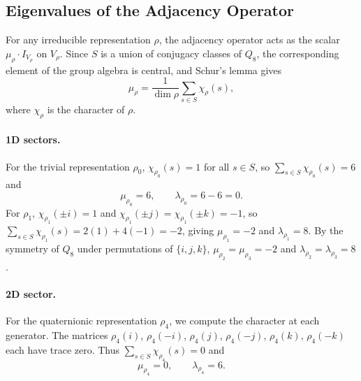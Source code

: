 \subsection{Eigenvalues of the Adjacency Operator}
  \label{subsec:eigenvalues-of-adjacency-operator}

  For any irreducible representation $\rho$, the adjacency operator acts as the
  scalar $\mu_\rho \cdot I_{V_\rho}$ on $V_\rho$.
  Since $S$ is a union of conjugacy classes of $Q_8$, the corresponding element
  of the group algebra is central, and Schur's lemma gives
  \begin{equation}
    \mu_\rho = \frac{1}{\dim \rho} \sum_{s \in S} \chi_\rho(s),
  \end{equation}
  where $\chi_\rho$ is the character of $\rho$.

  \paragraph{1D sectors.}
    For the trivial representation $\rho_0$, $\chi_{\rho_0}(s) = 1$ for all
    $s \in S$, so $\sum_{s \in S} \chi_{\rho_0}(s) = 6$ and
    \begin{equation}
      \mu_{\rho_0} = 6,
      \qquad
      \lambda_{\rho_0} = 6 - 6 = 0.
    \end{equation}
    For $\rho_1$, $\chi_{\rho_1}(\pm i) = 1$ and
    $\chi_{\rho_1}(\pm j) = \chi_{\rho_1}(\pm k) = -1$,
    so $\sum_{s \in S} \chi_{\rho_1}(s) = 2(1) + 4(-1) = -2$, giving
    $\mu_{\rho_1} = -2$ and $\lambda_{\rho_1} = 8$.
    By the symmetry of $Q_8$ under permutations of $\{i,j,k\}$,
    $\mu_{\rho_2} = \mu_{\rho_3} = -2$ and
    $\lambda_{\rho_2} = \lambda_{\rho_3} = 8$.

  \paragraph{2D sector.}
    For the quaternionic representation $\rho_4$, we compute the character at each
    generator.
    The matrices $\rho_4(i)$, $\rho_4(-i)$, $\rho_4(j)$, $\rho_4(-j)$,
    $\rho_4(k)$, $\rho_4(-k)$ each have trace zero.
    Thus $\sum_{s \in S} \chi_{\rho_4}(s) = 0$ and
    \begin{equation}
      \mu_{\rho_4} = 0,
      \qquad
      \lambda_{\rho_4} = 6.
    \end{equation}
